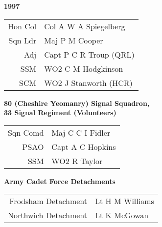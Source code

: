 \begin{center}
  \Huge
  \textbf{1997}
\end{center}

\begin{center}
  \small
  \begin{tabular}{rl}
    Hon Col & Col A W A Spiegelberg \\
    Sqn Ldr & Maj P M Cooper \\
    Adj & Capt P C R Troup (QRL) \\
    SSM & WO2 C M Hodgkinson \\
    SCM & WO2 J Stanworth (HCR) \\
  \end{tabular}
\end{center}

\begin{center}
  \Large
  \textbf{80 (Cheshire Yeomanry) Signal Squadron, \\ 33 Signal Regiment (Volunteers)}
\end{center}

\begin{center}
  \small
  \begin{tabular}{rl}
    Sqn Comd & Maj C C I Fidler \\
    PSAO & Capt A C Hopkins \\
    SSM & WO2 R Taylor \\
  \end{tabular}
\end{center}

\begin{center}
  \Large
  \textbf{Army Cadet Force Detachments}
\end{center}

\begin{center}
  \small
  \begin{tabular}{rl}
    Frodsham Detachment & Lt H M Williams \\
    Northwich Detachment & Lt K McGowan \\
  \end{tabular}
\end{center}

\vspace{50mm}

\pagebreak
